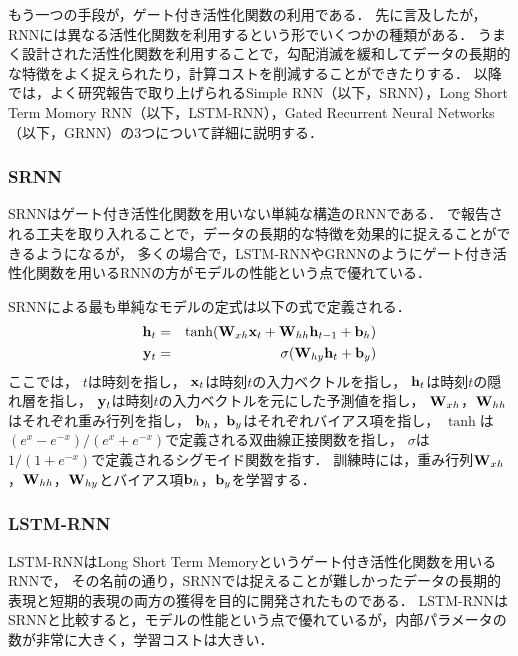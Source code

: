 もう一つの手段が，ゲート付き活性化関数の利用である．
先に言及したが，RNNには異なる活性化関数を利用するという形でいくつかの種類がある．
うまく設計された活性化関数を利用することで，勾配消滅を緩和してデータの長期的な特徴をよく捉えられたり，計算コストを削減することができたりする．
以降では，よく研究報告で取り上げられるSimple RNN（以下，SRNN）\cite{williams1989learning}，Long Short  Term Momory RNN（以下，LSTM-RNN）\cite{hochreiter1997long}，Gated Recurrent Neural Networks（以下，GRNN）\cite{cho2014learning}の3つについて詳細に説明する．



\subsubsection{SRNN}
SRNNはゲート付き活性化関数を用いない単純な構造のRNNである．
\cite{le2015simple, krueger2015regularizing}で報告される工夫を取り入れることで，データの長期的な特徴を効果的に捉えることができるようになるが，
多くの場合で，LSTM-RNNやGRNNのようにゲート付き活性化関数を用いるRNNの方がモデルの性能という点で優れている．

SRNNによる最も単純なモデルの定式は以下の式で定義される．
\begin{eqnarray}
\label{eq:srnn1}
{\bf h}_t &=& \tanh({\bf W}_{xh} {\bf x}_t + {\bf W}_{hh}  {\bf h}_{t-1} + {\bf b}_h)\\
\label{eq:srnn2}
{\bf y}_t &=& \sigma( {\bf W}_{hy} {\bf h}_t + {\bf b}_y)
\end{eqnarray}
ここでは，
$t$は時刻を指し，
${\bf x}_t$は時刻$t$の入力ベクトルを指し，
${\bf h}_t$は時刻$t$の隠れ層を指し，
${\bf y}_t$は時刻$t$の入力ベクトルを元にした予測値を指し，
${\bf W}_{xh}$，${\bf W}_{hh}$はそれぞれ重み行列を指し，
${\bf b}_h$，${\bf b}_y$はそれぞれバイアス項を指し，
$\tanh$は$( e^x - e^{-x} )/( e^x + e^{-x} )$で定義される双曲線正接関数を指し，
$\sigma$は$1 / (1 + e^{-x})$で定義されるシグモイド関数を指す．
訓練時には，重み行列${\bf W}_{xh}$，${\bf W}_{hh}$，${\bf W}_{hy}$とバイアス項${\bf b}_h$，${\bf b}_y$を学習する．


\subsubsection{LSTM-RNN}
LSTM-RNNはLong Short Term Memoryというゲート付き活性化関数を用いるRNNで，
その名前の通り，SRNNでは捉えることが難しかったデータの長期的表現と短期的表現の両方の獲得を目的に開発されたものである\cite{hochreiter1997long}．
LSTM-RNNはSRNNと比較すると，モデルの性能という点で優れているが，内部パラメータの数が非常に大きく，学習コストは大きい．

